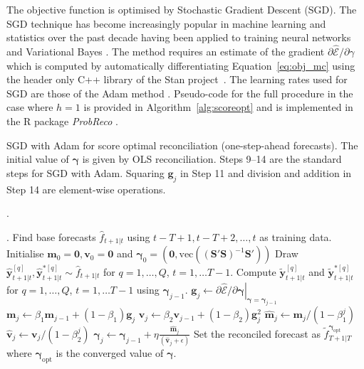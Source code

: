 \documentclass[11pt]{article}
\theoremstyle{definition}
\begin{document}
The objective function is optimised by Stochastic Gradient Descent (SGD). The SGD technique has become increasingly popular in machine learning and statistics over the past decade having been applied to training neural networks \citep{bottou2010} and Variational Bayes \citep{kingma2013}. The method requires an estimate of the gradient $\partial\hat{\mathcal{E}}/\partial{\gamma}$ which is computed by automatically differentiating Equation~\eqref{eq:obj_mc} using the header only C++ library of the Stan project~\citep{carpenter2015}. The learning rates used for SGD are those of the Adam method \citep[see][for details]{kingma2014}. Pseudo-code for the full procedure in the case where $h=1$ is provided in Algorithm~\ref{alg:scoreopt} and is implemented in the R package \textit{ProbReco} \citep{RProbReco}.

\begin{algorithm}
	\caption{SGD with Adam for score optimal reconciliation (one-step-ahead forecasts). The initial value of $\bm{\gamma}$ is given by OLS reconciliation. Steps 9--14 are the standard steps for SGD with Adam. Squaring $\bm{g}_j$ in Step 11 and division and addition in Step 14 are element-wise operations.}\label{alg:scoreopt}.
	\begin{algorithmic}[1]
		.
		  \State Find base forecasts $\hat{f}_{t+1|t}$ using $t-T+1,t-T+2,\ldots,t$ as training data.
		\EndFor
		\State Initialise $\bm{m}_0=\bm{0}, \bm{v}_0=\bm{0}$ and $\bm{\gamma}_0=\left(\bm{0},\text{vec}\left((\bm{S}'\bm{S})^{-1}\bm{S}'\right)\right)$
		\State Draw ${\hat{\bm{y}}}^{[q]}_{t+1|t},{\hat{\bm{y}}}^{*[q]}_{t+1|t}\sim \hat{f}_{t+1|t}$ for $q=1,\ldots,Q$, $t=1,\ldots T-1$.
		\State Compute $\tilde{\bm{y}}^{[q]}_{t+1|t}$ and $\tilde{\bm{y}}^{*[q]}_{t+1|t}$ for $q=1,\ldots,Q$, $t=1,\ldots T-1$ using $\bm{\gamma}_{j-1}$.
		\State $\bm{g}_j \gets \left.\partial\hat{\mathcal{E}}/\partial{\bm{\gamma}}\right|_{\bm{\gamma}=\bm{\gamma}_{j-1}}$ 
		\State $\bm{m}_j\gets\beta_1\bm{m}_{j-1}+(1-\beta_1)\bm{g}_j$ 
		\State $\bm{v}_j\gets\beta_2\bm{v}_{j-1}+(1-\beta_2)\bm{g}^2_j$ 
		\State $\hat{\bm{m}}_j\gets \bm{m}_j/(1-\beta_1^j)$ 
		\State $\hat{\bm{v}}_j\gets \bm{v}_j/(1-\beta_2^j)$ 
		\State $\bm{\gamma}_j\gets\bm{\gamma}_{j-1}+\eta\frac{\hat{\bm{m}}_j}{(\hat{\bm{v}}_j+\epsilon)}$ 
		\EndFor
		\State Set the reconciled forecast as $\tilde{f}^{\bm{\gamma}_{\text{opt}}}_{T+1|T}$ where $\bm{\gamma}_{\text{opt}}$ is the converged value of $\bm{\gamma}$.
		\EndProcedure
	\end{algorithmic}
\end{algorithm}
\end{document}
